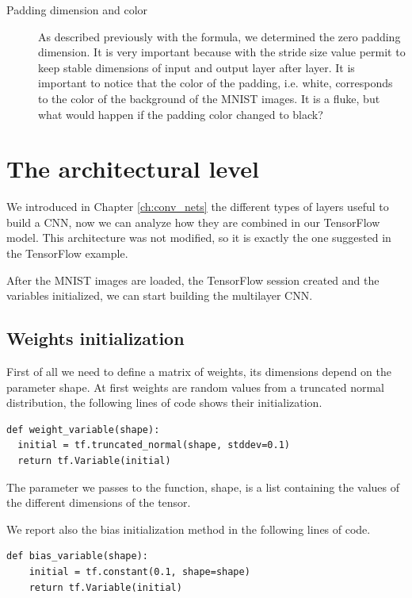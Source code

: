 \begin{description}
	\item[Padding dimension and color] As described previously with the formula, we determined the zero padding dimension. It is very important because with the stride size value permit to keep stable dimensions of input and output layer after layer. It is important to notice that the color of the padding, i.e. white, corresponds to the color of the background of the \acs{MNIST} images. It is a fluke, but what would happen if the padding color changed to black?

\end{description}

\section{The architectural level}

We introduced in Chapter \ref{ch:conv_nets} the different types of layers useful to build a \acs{CNN}, now we can analyze how they are combined in our TensorFlow model. This architecture was not modified, so it is exactly the one suggested in the TensorFlow example.

After the \acs{MNIST} images are loaded, the TensorFlow session created and the variables initialized, we can start building the multilayer \acs{CNN}.

\subsection{Weights initialization}

First of all we need to define a matrix of weights, its dimensions depend on the parameter shape. At first weights are random values from a truncated normal distribution, the following lines of code shows their initialization.

\begin{lstlisting}
def weight_variable(shape):
  initial = tf.truncated_normal(shape, stddev=0.1)
  return tf.Variable(initial)
\end{lstlisting}

The parameter we passes to the function, shape, is a list containing the values of the different dimensions of the tensor.

We report also the bias initialization method in the following lines of code.

\begin{lstlisting}
def bias_variable(shape):
	initial = tf.constant(0.1, shape=shape)
	return tf.Variable(initial)
\end{lstlisting}

